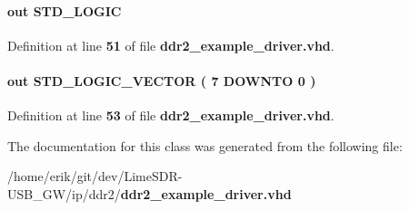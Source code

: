 \paragraph[{test\+\_\+complete}]{ {\bfseries \textcolor{keywordflow}{out}\textcolor{vhdlchar}{ }} {\bfseries \textcolor{comment}{S\+T\+D\+\_\+\+L\+O\+G\+IC}\textcolor{vhdlchar}{ }} \hspace{0.3cm}{\ttfamily [Port]}}\label{classddr2__example__driver_aac212ddd4ec9be4961eceb8ef19aaecb}


Definition at line {\bf 51} of file {\bf ddr2\+\_\+example\+\_\+driver.\+vhd}.

\paragraph[{test\+\_\+status}]{ {\bfseries \textcolor{keywordflow}{out}\textcolor{vhdlchar}{ }} {\bfseries \textcolor{comment}{S\+T\+D\+\_\+\+L\+O\+G\+I\+C\+\_\+\+V\+E\+C\+T\+OR}\textcolor{vhdlchar}{ }\textcolor{vhdlchar}{(}\textcolor{vhdlchar}{ }\textcolor{vhdlchar}{ } \textcolor{vhdldigit}{7} \textcolor{vhdlchar}{ }\textcolor{keywordflow}{D\+O\+W\+N\+TO}\textcolor{vhdlchar}{ }\textcolor{vhdlchar}{ } \textcolor{vhdldigit}{0} \textcolor{vhdlchar}{ }\textcolor{vhdlchar}{)}\textcolor{vhdlchar}{ }} \hspace{0.3cm}{\ttfamily [Port]}}\label{classddr2__example__driver_a65a7437c6740f28b77bc3969eb804463}


Definition at line {\bf 53} of file {\bf ddr2\+\_\+example\+\_\+driver.\+vhd}.



The documentation for this class was generated from the following file\+:\begin{DoxyCompactItemize}
\item 
/home/erik/git/dev/\+Lime\+S\+D\+R-\/\+U\+S\+B\+\_\+\+G\+W/ip/ddr2/{\bf ddr2\+\_\+example\+\_\+driver.\+vhd}\end{DoxyCompactItemize}
